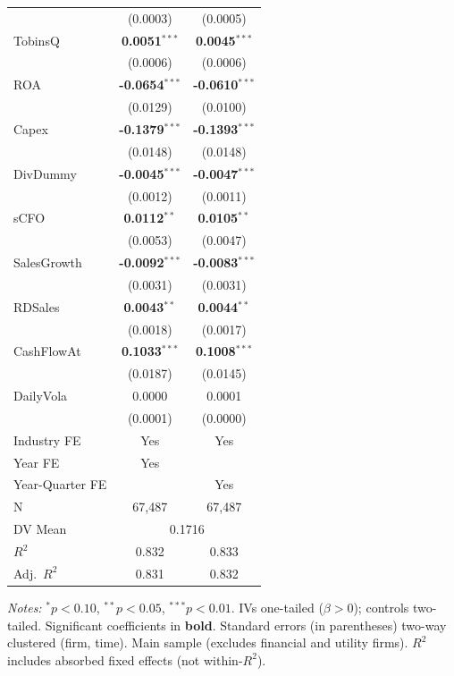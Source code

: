 \documentclass[11pt,a4paper]{article}
\begin{document}
\begin{table}[htbp]
\begin{tabular}{lcc}
 & (0.0003) & (0.0005) \\
TobinsQ & \textbf{0.0051}$^{***}$ & \textbf{0.0045}$^{***}$ \\
 & (0.0006) & (0.0006) \\
ROA & \textbf{-0.0654}$^{***}$ & \textbf{-0.0610}$^{***}$ \\
 & (0.0129) & (0.0100) \\
Capex & \textbf{-0.1379}$^{***}$ & \textbf{-0.1393}$^{***}$ \\
 & (0.0148) & (0.0148) \\
DivDummy & \textbf{-0.0045}$^{***}$ & \textbf{-0.0047}$^{***}$ \\
 & (0.0012) & (0.0011) \\
sCFO & \textbf{0.0112}$^{**}$ & \textbf{0.0105}$^{**}$ \\
 & (0.0053) & (0.0047) \\
SalesGrowth & \textbf{-0.0092}$^{***}$ & \textbf{-0.0083}$^{***}$ \\
 & (0.0031) & (0.0031) \\
RDSales & \textbf{0.0043}$^{**}$ & \textbf{0.0044}$^{**}$ \\
 & (0.0018) & (0.0017) \\
CashFlowAt & \textbf{0.1033}$^{***}$ & \textbf{0.1008}$^{***}$ \\
 & (0.0187) & (0.0145) \\
DailyVola & 0.0000 & 0.0001 \\
 & (0.0001) & (0.0000) \\
\midrule
Industry FE & Yes & Yes \\
Year FE & Yes &  \\
Year-Quarter FE &  & Yes \\
\midrule
N & 67,487 & 67,487 \\
DV Mean & \multicolumn{2}{c}{0.1716} \\
$R^2$ & 0.832 & 0.833 \\
Adj.~$R^2$ & 0.831 & 0.832 \\
\bottomrule
\end{tabular}
\begin{minipage}{\linewidth}
\vspace{2pt}\scriptsize
\textit{Notes:} 
$^{*}p<0.10$, $^{**}p<0.05$, $^{***}p<0.01$. IVs one-tailed ($\beta > 0$); controls two-tailed.
 Significant coefficients in \textbf{bold}.
 Standard errors (in parentheses) two-way clustered (firm, time).
 Main sample (excludes financial and utility firms).
 $R^2$ includes absorbed fixed effects (not within-$R^2$).
\end{minipage}
\end{table}
\end{document}
